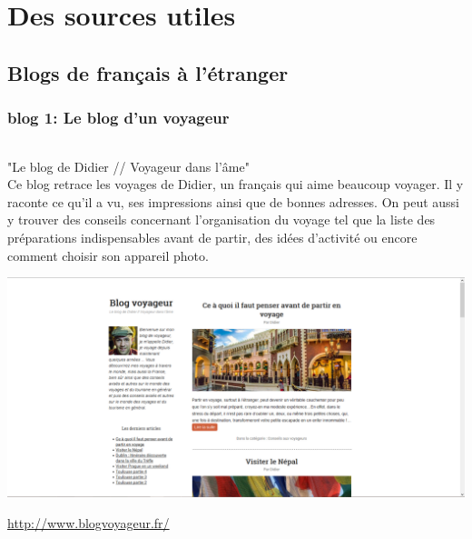 \part{Des sources utiles}

\chapter{Blogs de français à l'étranger}
\section{blog 1: Le blog d'un voyageur}
\paragraph{}
"Le blog de Didier // Voyageur dans l'âme" \\
Ce blog retrace les voyages de Didier, un français qui aime beaucoup voyager. Il y raconte ce qu'il a vu, ses impressions ainsi que de bonnes adresses. On peut aussi y trouver des conseils concernant l'organisation du voyage tel que la liste des préparations indispensables avant de partir, des idées d'activité ou encore comment choisir son appareil photo.
\begin{center}
\includegraphics[scale=0.25]{voyageur.png}
\end{center}
\url{http://www.blogvoyageur.fr/}

